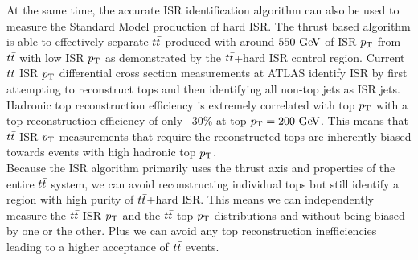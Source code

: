 \indent At the same time, the accurate ISR identification algorithm can also be used to measure the Standard Model production of hard ISR.  The thrust based algorithm is able to effectively separate $t\bar{t}$ produced with around $550 \gev$ of ISR $p_{\mathrm{T}}$ from $t\bar{t}$ with low ISR $p_{\mathrm{T}}$ as demonstrated by the $t\bar{t}$+hard ISR control region.  Current $t\bar{t}$ ISR $p_{\mathrm{T}}$ differential cross section measurements at ATLAS identify ISR by first attempting to reconstruct tops and then identifying all non-top jets as ISR jets.\cite{ttbarDiffCross}  Hadronic top reconstruction efficiency is extremely correlated with top $p_{\mathrm{T}}$ with a top reconstruction efficiency of only ~30\% at top $\pt = 200 \gev$.  This means that $t\bar{t}$ ISR $p_{\mathrm{T}}$ measurements that require the reconstructed tops are inherently biased towards events with high hadronic top $p_{\mathrm{T}}$. \\

\indent Because the ISR algorithm primarily uses the thrust axis and properties of the entire $t\bar{t}$ system, we can avoid reconstructing individual tops but still identify a region with high purity of $t\bar{t}$+hard ISR.  This means we can independently measure the $t\bar{t}$ ISR $p_{\mathrm{T}}$ and the $t\bar{t}$ top $p_{\mathrm{T}}$ distributions and without being biased by one or the other.  Plus we can avoid any top reconstruction inefficiencies leading to a higher acceptance of $t\bar{t}$ events. \\
